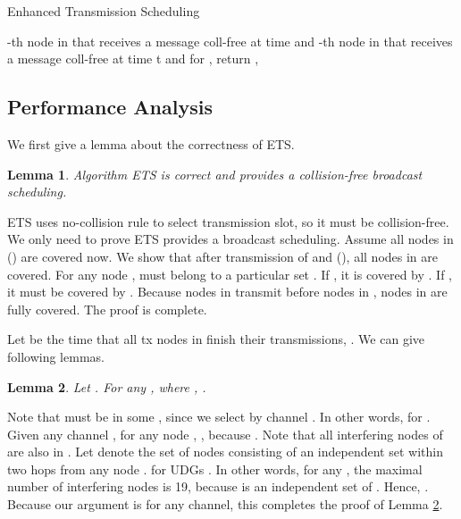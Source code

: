 \documentclass[10pt, conference]{IEEEtran}
\newtheorem{lemma}{Lemma}
\begin{document}
\begin{algorithm}[tbp]
\caption{Enhanced Transmission Scheduling}
\label{scheduling}
\KwIn{}
\KwOut{, }
{
    \;
    {
        \;
    }
}
\;
{
 {
    {
         -th node in \;
         that receives a message coll-free at time
\;
        \;
 and \;
        {
            \;
        }
    }
    {
         -th node in \;
          that receives a message coll-free at time
t\;
         and \;
        {
            \;
        }
    }
 }
}
 for , \;
return , \;
\end{algorithm}



\subsection{Performance Analysis}
We first give a lemma about the correctness of ETS.
\begin{lemma} \label{correctness}
Algorithm ETS is correct and provides a collision-free broadcast scheduling.
\end{lemma}
\begin{IEEEproof}
ETS uses no-collision rule to select transmission slot, so it
must be collision-free. We only need to prove ETS provides a
broadcast scheduling. Assume all nodes in  () are covered now. We show that after transmission of
 and  (), all nodes in
 are covered. For any node ,  must
belong to a particular set . If ,
it is covered by . If , it must be covered by . Because nodes in
 transmit before nodes in , nodes in
 are fully covered. The proof is complete.

\end{IEEEproof}

Let  be the time that all tx nodes in  finish their
transmissions, . We can give following lemmas.
\begin{lemma} \label{dominators}
Let . For any ,  where , .
\end{lemma}
\begin{IEEEproof}
Note that  must be in some , since we select
 by channel . In other words,  for .
Given any channel , for any node ,
, because .
Note that all interfering nodes of  are also in
. Let  denote the set of nodes consisting of an independent set within two hops
from any node .  for UDGs
\cite{info09}. In other words, for any , the maximal number of interfering
nodes is 19, because  is an independent set of .
Hence, . Because our
argument is for any channel, this completes the proof of Lemma \ref{dominators}.
\end{IEEEproof}
\end{document}
